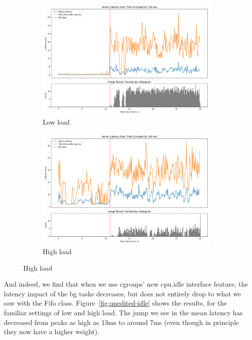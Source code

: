 \begin{figure}[t]
    \centering
    \begin{subfigure}[t]{0.48\textwidth}
        \includegraphics[width=\textwidth]{graphs/unedited-idle-low-two.png}
        \caption{Low load}\label{fig:unedited-idle-low-two}
    \end{subfigure}
    \hspace{\fill}
    \begin{subfigure}[t]{0.48\textwidth}
        \includegraphics[width=\textwidth]{graphs/unedited-idle-high-two.png}
        \caption{High load}\label{fig:unedited-idle-high-two}
    \end{subfigure}
\end{figure}\label{fig:unedited-idle}

And indeed, we find that when we use cgroups' new cpu.idle interface feature,
the latency impact of the bg tasks decreases, but does not entirely drop to what
we saw with the Fifo class. Figure~\ref{fig:unedited-idle} shows the results,
for the familiar settings of low and high load. The jump we see in the mean
latency has decreased from peaks as high as 13ms to around 7ms (even though in
principle they now have a higher weight).


